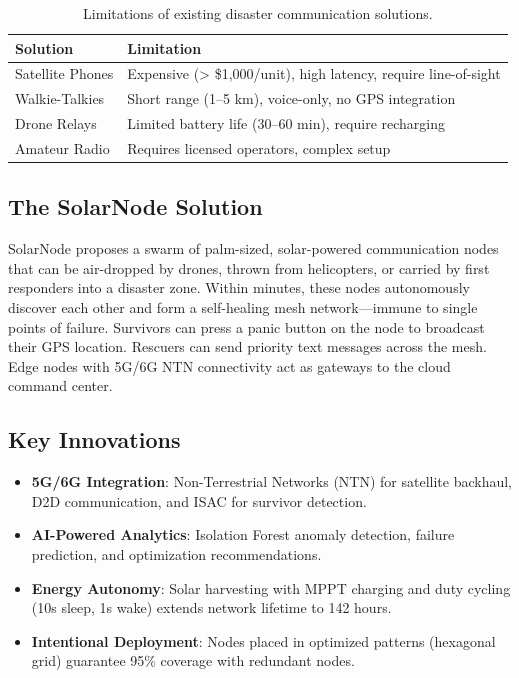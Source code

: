 \documentclass[12pt,a4paper]{article}
\begin{document}
\begin{table}[H]
\centering
\begin{tabular}{@{}l p{8cm}@{}}
\toprule
\textbf{Solution} & \textbf{Limitation} \\
\midrule
Satellite Phones & Expensive (> \$1,000/unit), high latency, require line-of-sight \\
Walkie-Talkies & Short range (1–5 km), voice-only, no GPS integration \\
Drone Relays & Limited battery life (30–60 min), require recharging \\
Amateur Radio & Requires licensed operators, complex setup \\
\bottomrule
\end{tabular}
\caption{Limitations of existing disaster communication solutions.}
\label{tab:current_solutions}
\end{table}

\subsection*{The SolarNode Solution}

SolarNode proposes a swarm of palm-sized, solar-powered communication nodes that can be air-dropped by drones, thrown from helicopters, or carried by first responders into a disaster zone. Within minutes, these nodes autonomously discover each other and form a self-healing mesh network—immune to single points of failure. Survivors can press a panic button on the node to broadcast their GPS location. Rescuers can send priority text messages across the mesh. Edge nodes with 5G/6G NTN connectivity act as gateways to the cloud command center.

\subsection*{Key Innovations}

\begin{itemize}
    \item \textbf{5G/6G Integration}: Non-Terrestrial Networks (NTN) for satellite backhaul, D2D communication, and ISAC for survivor detection.
    \item \textbf{AI-Powered Analytics}: Isolation Forest anomaly detection, failure prediction, and optimization recommendations.
    \item \textbf{Energy Autonomy}: Solar harvesting with MPPT charging and duty cycling (10s sleep, 1s wake) extends network lifetime to 142 hours.
    \item \textbf{Intentional Deployment}: Nodes placed in optimized patterns (hexagonal grid) guarantee 95\% coverage with redundant nodes.
\end{itemize}
\end{document}
